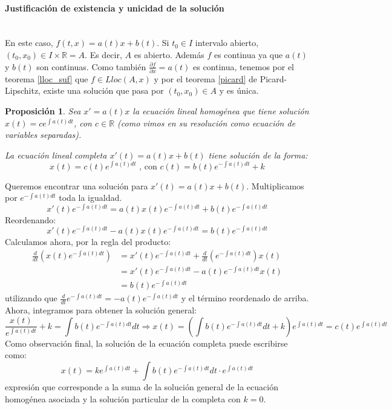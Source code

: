 \documentclass[11pt]{article}
\makeatletter
\theoremstyle{theorem-style}  %
\newtheorem{proposition}[theorem]{Proposición}
\renewenvironment{proof}[1][\proofname]{\par
	\pushQED{\qed}%
	\normalfont \topsep6\p@\@plus6\p@\relax
	\list{}{%
		\settowidth{\leftmargin}{\quad:\hskip\labelsep}%
		\setlength{\labelwidth}{0pt}%
		\setlength{\itemindent}{-\leftmargin}%
	}%
	\item[\hskip\labelsep\itshape#1\@addpunct{:}]\ignorespaces
}{%
	\popQED\endlist\@endpefalse
}
\theoremstyle{definition-style}
\theoremstyle{example-style}
\makeatother
\begin{document}
\paragraph{Justificación de existencia y unicidad de la solución}\ \\
En este caso, $ f(t,x)=a(t)x+b(t) $. Si $ t_0\in I $ intervalo abierto, $ (t_0, x_0)\in I\times \mathbb{R}=A $. Es decir, $ A $ es abierto. Además $ f $ es continua ya que $ a(t) $ y $ b(t) $ son continuas. Como también $ \frac{\partial f}{\partial x}=a(t) $ es continua, tenemos por el teorema \ref{lloc_suf} que $ f\in L{loc}(A,x) $ y por el teorema \ref{picard} de Picard-Lipschitz, existe una solución que pasa por $ (t_0, x_0)\in A$ y es única.

\begin{proposition}\label{ecLinCompleta}
	Sea $ x'=a(t)x $ la ecuación lineal homogénea que tiene solución $ x(t)=c e^{\int a(t) dt} $, con $ c\in \mathbb{R} $ (como vimos en su resolución como ecuación de variables separadas). 
	
	La ecuación lineal completa $ x'(t)=a(t)x+b(t) $ tiene solución de la forma: \[ x(t)= c(t)e^{\int a(t) dt}\text{ , con } c(t)= b(t)e^{-\int a(t) dt}+k\]
\end{proposition}
\begin{proof}
	Queremos encontrar una solución para $ x'(t)=a(t)x+b(t) $. Multiplicamos por $ e^{-\int a(t)dt} $  toda la igualdad.
	\[ x'(t)e^{-\int a(t)dt}=a(t)x(t)e^{-\int a(t)dt}+b(t)e^{-\int a(t)dt}\]
	Reordenando:
	\[  x'(t)e^{-\int a(t)dt}-a(t)x(t)e^{-\int a(t)dt}=b(t)e^{-\int a(t)dt} \]
	Calculamos ahora, por la regla del producto:	
	\[ \begin{split}
	\frac{d}{dt}(x(t)e^{-\int a(t)dt})&=x'(t)e^{-\int a(t)dt}+\frac{d}{dt}(e^{-\int a(t)dt})x(t)\\
	&=x'(t)e^{-\int a(t)dt}-a(t)e^{-\int a(t)dt}x(t)\\
	&=b(t)e^{-\int a(t)dt}
	\end{split} \]
	utilizando que $ \frac{d}{dt}e^{-\int a(t)dt}=-a(t)e^{-\int a(t)dt} $ y el término reordenado de arriba.
	Ahora, integramos para obtener la solución general:
	\[ \frac{x(t)}{e^{\int a(t)dt}}+k= \int b(t)e^{-\int a(t)dt} dt\Rightarrow x(t)= (\int b(t)e^{-\int a(t)dt} dt+k)e^{\int a(t)dt}=c(t)e^{\int a(t)dt} \]
	Como observación final, la solución de la ecuación completa puede escribirse como:
	\[ x(t)= ke^{\int a(t)dt}+\int b(t)e^{-\int a(t)dt} dt\cdot e^{\int a(t)dt} \]
	 expresión que corresponde a la suma de la solución general de la ecuación homogénea asociada y la solución particular de la completa con $ k=0 $.
\end{proof}
\end{document}

